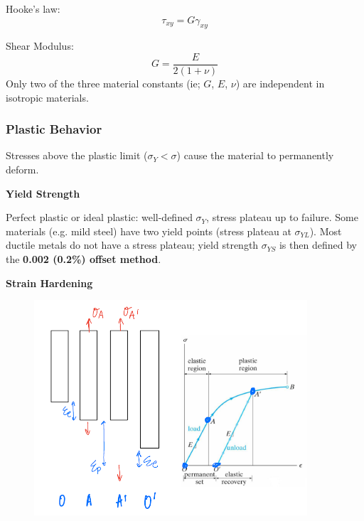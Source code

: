 \vspace{5pt}
\noindent Hooke's law: \[\tau_{xy} = G\gamma_{xy}\]

\noindent Shear Modulus: \[G = \frac{E}{2(1+\nu)}\]
\noindent Only two of the three material constants (ie; $G$, $E$, $\nu$) are independent in isotropic materials.

\subsubsection{Plastic Behavior}

Stresses above the plastic limit ($\sigma_Y < \sigma$) cause the material to permanently deform.

\vspace{3mm}
\noindent \textbf{Yield Strength}

\vspace{5pt}

\noindent Perfect plastic or ideal plastic: well-defined $\sigma_Y$, stress plateau up to failure. Some materials (e.g. mild steel) have two yield points (stress plateau at $\sigma_{YL}$). Most ductile metals do not have a stress plateau; yield strength $\sigma_{YS}$ is then defined by the \textbf{0.002 (0.2\%) offset method}.

\vspace{3mm}
\noindent \textbf{Strain Hardening}

\begin{figure}[!h]
\centering
\includegraphics[angle=0, width=4in]{Material Properties-Figures/Strain Hardening.png}
\vspace{-2mm}
\caption{\small {}}
\vspace{-3mm}
\label{Fig:StrainHardening}
\end{figure}


